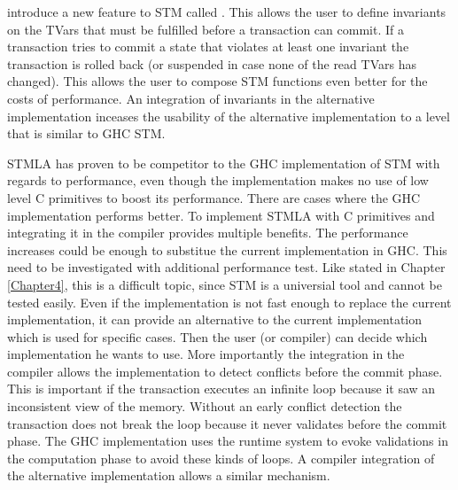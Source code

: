 \parencite{invariants} introduce a new feature to STM called .
This allows the user to define invariants on the TVars that must be fulfilled before a transaction
can commit. If a transaction tries to commit a state that violates at least one invariant the 
transaction is rolled back (or suspended in case none of the read TVars has changed). This allows
the user to compose STM functions even better for the costs of performance. An integration of 
invariants in the alternative implementation inceases the usability of the alternative implementation
to a level that is similar to GHC STM.

STMLA has proven to be competitor to the GHC implementation of STM with regards to performance, even 
though the implementation makes no use of low level C primitives to boost its performance. There are 
cases where the GHC implementation performs better. To implement STMLA 
with C primitives and integrating it in the compiler provides multiple benefits. The performance 
increases could be enough to substitue the current implementation in GHC. This need to be investigated
with additional performance test. Like stated in Chapter \ref{Chapter4}, this is a difficult topic,
since STM is a universial tool and cannot be tested easily. Even if the implementation is not fast
enough to replace the current implementation, it can provide an alternative to the current implementation
which is used for specific cases. Then the user (or compiler) can decide which implementation he wants to use. 
More importantly the integration
in the compiler allows the implementation to detect conflicts before the commit phase. This is 
important if the transaction executes an infinite loop because it saw an inconsistent view of the 
memory. Without an early conflict detection the transaction does not break the loop because it never
validates before the commit phase. The GHC implementation uses the runtime system to evoke validations
in the computation phase to avoid these kinds of loops. A compiler integration of the alternative 
implementation allows a similar mechanism.

